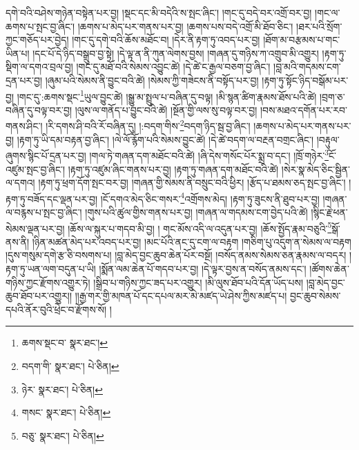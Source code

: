 དགེ་བའི་བཤེས་གཉེན་བསྟེན་པར་བྱ། །སྡང་དང་མི་བདེའི་ས་སྤང་ཞིང་། །གང་དུ་བདེ་བར་འགྲོ་བར་བྱ། །གང་ལ་ཆགས་པ་སྤང་བྱ་ཞིང་། །ཆགས་པ་མེད་པར་གནས་པར་བྱ། །ཆགས་པས་བདེ་འགྲོ་མི་ཐོབ་ཅིང་། །ཐར་པའི་སྲོག་ཀྱང་གཅོད་པར་བྱེད། །གང་དུ་དགེ་བའི་ཆོས་མཐོང་བ། །དེར་ནི་རྟག་ཏུ་འབད་པར་བྱ། །ཐོག་མ་བརྩམས་པ་གང་ཡིན་པ། །དང་པོ་དེ་ཉིད་བསྒྲུབ་བྱ་སྟེ། །དེ་ལྟ་ན་ནི་ཀུན་ལེགས་བྱས། །གཞན་དུ་གཉིས་ཀ་འགྲུབ་མི་འགྱུར། །རྟག་ཏུ་སྡིག་ལ་དགའ་བྲལ་བྱ། །གང་དུ་མཐོ་བའི་སེམས་འབྱུང་ཚེ། །དེ་ཚེ་ང་རྒྱལ་བཅག་བྱ་ཞིང་། །བླ་མའི་གདམས་ངག་དྲན་པར་བྱ། །ཞུམ་པའི་སེམས་ནི་བྱུང་བའི་ཚེ། །སེམས་ཀྱི་གཟེངས་ནི་བསྟོད་པར་བྱ། །རྟག་ཏུ་སྟོང་ཉིད་བསྒོམ་པར་བྱ། །གང་དུ་:ཆགས་སྡང་\footnote{ཆགས་སྡང་བ་  སྣར་ཐང་། }ཡུལ་བྱུང་ཚེ། །སྒྱུ་མ་སྤྲུལ་པ་བཞིན་དུ་བལྟ། །མི་སྙན་ཚིག་རྣམས་ཐོས་པའི་ཚེ། །བྲག་ཅ་བཞིན་དུ་བལྟ་བར་བྱ། །ལུས་ལ་གནོད་པ་བྱུང་བའི་ཚེ། །སྔོན་གྱི་ལས་སུ་བལྟ་བར་བྱ། །བས་མཐའ་དགོན་པར་རབ་གནས་ཤིང་། །རི་དགས་ཤི་བའི་རོ་བཞིན་དུ། །:བདག་གིས་\footnote{བདག་གི་  སྣར་ཐང་།  པེ་ཅིན། }བདག་ཉིད་སྦ་བྱ་ཞིང་། །ཆགས་པ་མེད་པར་གནས་པར་བྱ། །རྟག་ཏུ་ཡི་དམ་བརྟན་བྱ་ཞིང་། །ལེ་ལོ་རྙོག་པའི་སེམས་བྱུང་ཚེ། །དེ་ཚེ་བདག་ལ་བརྔན་བགྲང་ཞིང་། །བརྟུལ་ཞུགས་སྙིང་པོ་དྲན་པར་བྱ། །གལ་ཏེ་གཞན་དག་མཐོང་བའི་ཚེ། །ཞི་དེས་གསོང་པོར་སྨྲ་བ་དང་། །ཁྲོ་གཉེར་\footnote{ཉེར་  སྣར་ཐང་།  པེ་ཅིན། }ངོ་འཛུམ་སྤང་བྱ་ཞིང་། །རྟག་ཏུ་འཛུམ་ཞིང་གནས་པར་བྱ། །རྟག་ཏུ་གཞན་དག་མཐོང་བའི་ཚེ། །སེར་སྣ་མེད་ཅིང་སྦྱིན་ལ་དགའ། །རྟག་ཏུ་ཕྲག་དོག་སྤང་བར་བྱ། །གཞན་གྱི་སེམས་ནི་བསྲུང་བའི་ཕྱིར། །རྩོད་པ་ཐམས་ཅད་སྤང་བྱ་ཞིང་། །རྟག་ཏུ་བཟོད་དང་ལྡན་པར་བྱ། །ངོ་དགའ་མེད་ཅིང་གསར་\footnote{གསང་  སྣར་ཐང་།  པེ་ཅིན། }འགྲོགས་མེད། །རྟག་ཏུ་ཟུངས་ནི་ཐུབ་པར་བྱ། །གཞན་ལ་བརྙས་པ་སྤང་བྱ་ཞིང་། །གུས་པའི་ཚུལ་གྱིས་གནས་པར་བྱ། །གཞན་ལ་གདམས་ངག་བྱེད་པའི་ཚེ། །སྙིང་རྗེ་ཕན་སེམས་ལྡན་པར་བྱ། །ཆོས་ལ་སྐུར་པ་གདབ་མི་བྱ། །
གང་མོས་འདི་ལ་འདུན་པར་བྱ། །ཆོས་སྤྱོད་རྣམ་བཅུའི་\footnote{བཅུ་  སྣར་ཐང་།  པེ་ཅིན། }སྒོ་ནས་ནི། །ཉིན་མཚན་མེད་པར་འབད་པར་བྱ། །མང་པོའི་ནང་དུ་ངག་ལ་བརྟག །གཅིག་པུ་འདུག་ན་སེམས་ལ་བརྟག །དུས་གསུམ་དགེ་རྩ་ཅི་བསགས་པ། །བླ་མེད་བྱང་ཆུབ་ཆེན་པོར་བསྔོ། །བསོད་ནམས་སེམས་ཅན་རྣམས་ལ་བདར། །རྟག་ཏུ་ཡན་ལག་བདུན་པ་ཡི། །སྨོན་ལམ་ཆེན་པོ་གདབ་པར་བྱ། །དེ་ལྟར་བྱས་ན་བསོད་ནམས་དང་། །ཚོགས་ཆེན་གཉིས་ཀྱང་རྫོགས་འགྱུར་ཏེ། །སྒྲིབ་པ་གཉིས་ཀྱང་ཟད་པར་འགྱུར། །མི་ལུས་ཐོབ་པའི་དོན་ཡོད་པས། །བླ་མེད་བྱང་ཆུབ་ཐོབ་པར་འགྱུར།། །།རྒྱ་གར་གྱི་མཁན་པོ་དང་དཔལ་མར་མེ་མཛད་ཡེ་ཤེས་ཀྱིས་མཛད་པ། བྱང་ཆུབ་སེམས་དཔའི་ནོར་བུའི་ཕྲེང་བ་རྫོགས་སོ། ། 